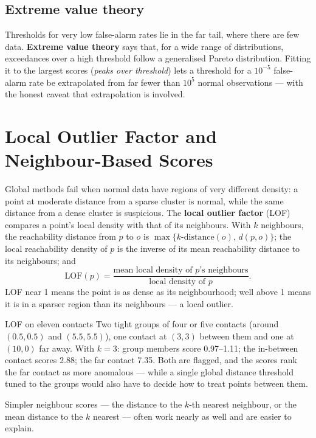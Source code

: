\documentclass[11pt]{article}
\begin{document}
\subsection{Extreme value theory}
Thresholds for very low false-alarm rates lie in the far tail, where there are few data. \textbf{Extreme value theory} says that, for a wide range of distributions, exceedances over a high threshold follow a generalised Pareto distribution. Fitting it to the largest scores (\emph{peaks over threshold}) lets a threshold for a $10^{-5}$ false-alarm rate be extrapolated from far fewer than $10^5$ normal observations --- with the honest caveat that extrapolation is involved.

\section{Local Outlier Factor and Neighbour-Based Scores}
Global methods fail when normal data have regions of very different density: a point at moderate distance from a sparse cluster is normal, while the same distance from a dense cluster is suspicious. The \textbf{local outlier factor} (LOF) compares a point's local density with that of its neighbours. With $k$ neighbours, the reachability distance from $p$ to $o$ is $\max\{k\text{-distance}(o),\,d(p,o)\}$; the local reachability density of $p$ is the inverse of its mean reachability distance to its neighbours; and
\[\text{LOF}(p)=\frac{\text{mean local density of }p\text{'s neighbours}}{\text{local density of }p}.\]
LOF near 1 means the point is as dense as its neighbourhood; well above 1 means it is in a sparser region than its neighbours --- a local outlier.
\begin{example}{LOF on eleven contacts}
Two tight groups of four or five contacts (around $(0.5,0.5)$ and $(5.5,5.5)$), one contact at $(3,3)$ between them and one at $(10,0)$ far away. With $k=3$: group members score 0.97--1.11; the in-between contact scores 2.88; the far contact 7.35. Both are flagged, and the scores rank the far contact as more anomalous --- while a single global distance threshold tuned to the groups would also have to decide how to treat points between them.
\end{example}
Simpler neighbour scores --- the distance to the $k$-th nearest neighbour, or the mean distance to the $k$ nearest --- often work nearly as well and are easier to explain.
\end{document}
